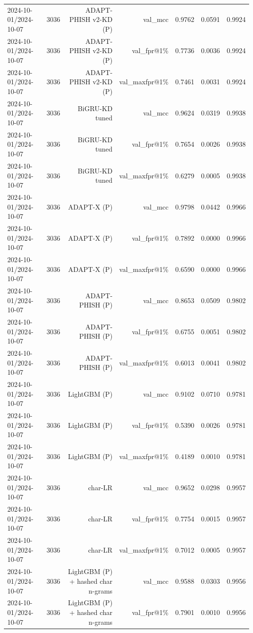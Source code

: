 \begin{table}[t]
\begin{tabular}{llrrrrr}
2024-10-01/2024-10-07 & 3036 & ADAPT-PHISH v2-KD (P) & val\_mcc & 0.9762 & 0.0591 & 0.9924 \\
2024-10-01/2024-10-07 & 3036 & ADAPT-PHISH v2-KD (P) & val\_fpr@1\% & 0.7736 & 0.0036 & 0.9924 \\
2024-10-01/2024-10-07 & 3036 & ADAPT-PHISH v2-KD (P) & val\_maxfpr@1\% & 0.7461 & 0.0031 & 0.9924 \\
2024-10-01/2024-10-07 & 3036 & BiGRU-KD tuned & val\_mcc & 0.9624 & 0.0319 & 0.9938 \\
2024-10-01/2024-10-07 & 3036 & BiGRU-KD tuned & val\_fpr@1\% & 0.7654 & 0.0026 & 0.9938 \\
2024-10-01/2024-10-07 & 3036 & BiGRU-KD tuned & val\_maxfpr@1\% & 0.6279 & 0.0005 & 0.9938 \\
2024-10-01/2024-10-07 & 3036 & ADAPT-X (P) & val\_mcc & 0.9798 & 0.0442 & 0.9966 \\
2024-10-01/2024-10-07 & 3036 & ADAPT-X (P) & val\_fpr@1\% & 0.7892 & 0.0000 & 0.9966 \\
2024-10-01/2024-10-07 & 3036 & ADAPT-X (P) & val\_maxfpr@1\% & 0.6590 & 0.0000 & 0.9966 \\
2024-10-01/2024-10-07 & 3036 & ADAPT-PHISH (P) & val\_mcc & 0.8653 & 0.0509 & 0.9802 \\
2024-10-01/2024-10-07 & 3036 & ADAPT-PHISH (P) & val\_fpr@1\% & 0.6755 & 0.0051 & 0.9802 \\
2024-10-01/2024-10-07 & 3036 & ADAPT-PHISH (P) & val\_maxfpr@1\% & 0.6013 & 0.0041 & 0.9802 \\
2024-10-01/2024-10-07 & 3036 & LightGBM (P) & val\_mcc & 0.9102 & 0.0710 & 0.9781 \\
2024-10-01/2024-10-07 & 3036 & LightGBM (P) & val\_fpr@1\% & 0.5390 & 0.0026 & 0.9781 \\
2024-10-01/2024-10-07 & 3036 & LightGBM (P) & val\_maxfpr@1\% & 0.4189 & 0.0010 & 0.9781 \\
2024-10-01/2024-10-07 & 3036 & char-LR & val\_mcc & 0.9652 & 0.0298 & 0.9957 \\
2024-10-01/2024-10-07 & 3036 & char-LR & val\_fpr@1\% & 0.7754 & 0.0015 & 0.9957 \\
2024-10-01/2024-10-07 & 3036 & char-LR & val\_maxfpr@1\% & 0.7012 & 0.0005 & 0.9957 \\
2024-10-01/2024-10-07 & 3036 & LightGBM (P) + hashed char n-grams & val\_mcc & 0.9588 & 0.0303 & 0.9956 \\
2024-10-01/2024-10-07 & 3036 & LightGBM (P) + hashed char n-grams & val\_fpr@1\% & 0.7901 & 0.0010 & 0.9956 \\

\end{tabular}
\end{table}
